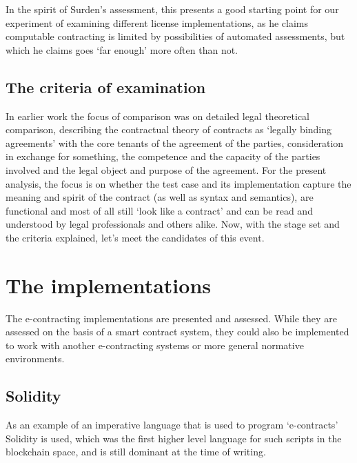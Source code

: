 \documentclass{article}
\begin{document}
In the spirit of Surden’s assessment, this presents a good starting point for our experiment of examining different license implementations, as he claims computable contracting is limited by possibilities of automated assessments, but which he claims goes ‘far enough’ more often than not.

\subsection{The criteria of examination}
In earlier work the focus of comparison was on detailed legal theoretical comparison, describing the contractual theory of contracts as ‘legally binding agreements’  with the core tenants of the agreement of the parties, consideration in exchange for something, the competence and the capacity of the parties involved and the legal object and purpose of the agreement. \cite{governatoriLegalContractsImperative2018} %
For the present analysis, the focus is on whether the test case and its implementation capture the meaning and spirit of the contract (as well as syntax and semantics), are functional and most of all still ‘look like a contract’ and can be read and understood by legal professionals and others alike. 
Now, with the stage set and the criteria explained, let’s meet the candidates of this event.

\section{The implementations}
The e-contracting implementations are presented and assessed. While they are assessed on the basis of a smart contract system, they could %
also be implemented to work with another e-contracting systems or more general normative environments. 

\subsection{Solidity}
As an example of an imperative language that is used to program ‘e-contracts’ Solidity is used, which was the first higher level language for such scripts in the blockchain space, and is still dominant at the time of writing. \cite{SoliditySummit20202020}
\end{document}
